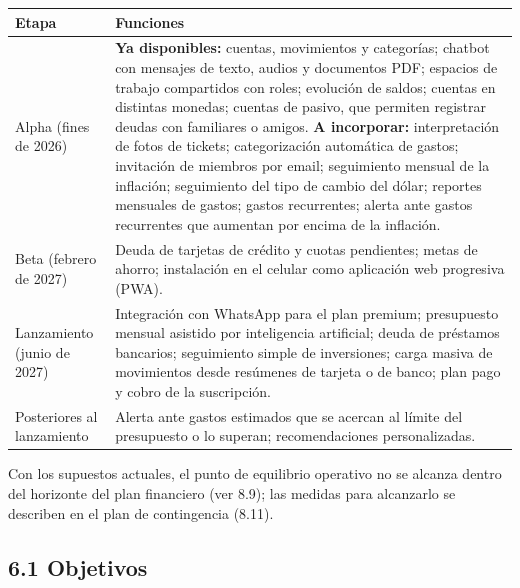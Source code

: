 {\def\LTcaptype{none} %
\begin{longtable}[]{@{}
  >{\raggedright\arraybackslash}p{}
  >{\raggedright\arraybackslash}p{}@{}}
\toprule\noalign{}
\begin{minipage}[b]{\linewidth}\raggedright
Etapa
\end{minipage} & \begin{minipage}[b]{\linewidth}\raggedright
Funciones
\end{minipage} \\
\midrule\noalign{}
\endhead
\bottomrule\noalign{}
\endlastfoot
Alpha (fines de 2026) & \textbf{Ya disponibles:} cuentas, movimientos y
categorías; chatbot con mensajes de texto, audios y documentos PDF;
espacios de trabajo compartidos con roles; evolución de saldos; cuentas
en distintas monedas; cuentas de pasivo, que permiten registrar deudas
con familiares o amigos. \textbf{A incorporar:} interpretación de fotos
de tickets; categorización automática de gastos; invitación de miembros
por email; seguimiento mensual de la inflación; seguimiento del tipo de
cambio del dólar; reportes mensuales de gastos; gastos recurrentes;
alerta ante gastos recurrentes que aumentan por encima de la
inflación. \\
Beta (febrero de 2027) & Deuda de tarjetas de crédito y cuotas
pendientes; metas de ahorro; instalación en el celular como aplicación
web progresiva (PWA). \\
Lanzamiento (junio de 2027) & Integración con WhatsApp para el plan
premium; presupuesto mensual asistido por inteligencia artificial; deuda
de préstamos bancarios; seguimiento simple de inversiones; carga masiva
de movimientos desde resúmenes de tarjeta o de banco; plan pago y cobro
de la suscripción. \\
Posteriores al lanzamiento & Alerta ante gastos estimados que se acercan
al límite del presupuesto o lo superan; recomendaciones
personalizadas. \\
\end{longtable}
}

Con los supuestos actuales, el punto de equilibrio operativo no se
alcanza dentro del horizonte del plan financiero (ver 8.9); las medidas
para alcanzarlo se describen en el plan de contingencia (8.11).


\subsection*{6.1 Objetivos}\label{objetivos}


